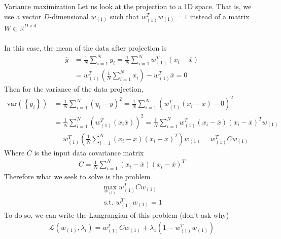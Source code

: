 \begin{parag}{Variance maximization}
    Let us look at the projection to a 1D space. That is, we use a vector $D$-dimensional $w_{\left(1\right)}$ such that $w_{\left(1\right)}^{T}w_{\left(1\right)} = 1$ instead of a matrix $W \in \mathbb{R}^{D \times d}$\\
	$ $\\
	In this case, the mean of the data after projection is 
	\begin{align*} 
		\overline{y} &=  \frac{1}{N} \sum_{i= 1}^{N} y_i = \frac{1}{N} \sum_{i= 1}^{N}w_{\left(1\right)}^{T}\left(x_i - \overline{x}\right)\\
		&= w_{\left(1\right)}^{T} \left(\frac{1}{N}\sum_{i= 1}^{N}x_i\right) - w_{\left(1\right)}^{T}\overline{x} = 0
	\end{align*}
	Then for the variance of the data projection, 
	\begin{align*} 
		\text{var} \left(\left\{y_i\right\}\right) &= \frac{1}{N} \sum_{i= 1}^{N} \left(y_i - \overline{y}\right)^2 = \frac{1}{N} \sum_{i= 1}^{N} \left(w_{\left(1\right)}^{T}\left(x_i - \overline{x}\right) - 0\right)^2 \\
												   &= \frac{1}{N} \sum_{i= 1}^{N} \left(w_{\left(1\right)}^{T}\left(x_i \overline{x}\right)\right)^2 =  \frac{1}{N} \sum_{i= 1}^{N} w_{\left(1\right)}^{T}\left(x_i - \overline{x}\right)\left(x_i - \overline{x}\right)^{T}w_{\left(1\right)}\\
												   &= w_{\left(1\right)}^{T}\left(\frac{1}{N}\sum_{i= 1}^{N}\left(x_i - \overline{x}\right)\left(x_i - \overline{x}\right)^{T}\right)w_{\left(1\right)} =  w_{\left(1\right)}^{T}Cw_{\left(1\right)}
	\end{align*}
	Where $C$ is the input data covariance matrix 
	\begin{align*} 
		C = \frac{1}{N} \sum_{i= 1}^{N}\left(x_i - \overline{x}\right) \left(x_i - \overline{x}\right)^{T}
	\end{align*}
	Therefore what we seek to solve is the problem 
	\begin{align*} 
		\max_{w_{\left(1\right)}} w_{\left(1\right)}^{T}Cw_{\left(1\right)}\\
		\text{ s.t. } w_{\left(1\right)}^{T}w_{\left(1\right)} = 1
	\end{align*}
	To do so, we can write the Langrangian of this problem (don't ask why)
	\begin{align*} 
		\mathcal{L}\left(w_{\left(1\right)}, \lambda_i\right) = w_{\left(1\right)}^{T} Cw_{\left(1\right)} + \lambda_1 \left(1 - w_{\left(1\right)}^{T}w_{\left(1\right)}\right)

\end{align*}
\end{parag}
